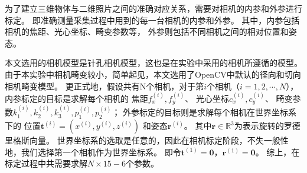 \documentclass{ctexart}
\begin{document}
为了建立三维物体与二维照片之间的准确对应关系，需要对相机的内参和外参进行标定。
即准确测量采集过程中用到的每一台相机的内参和外参。
其中，内参包括相机的焦距、光心坐标、畸变参数等，
外参则包括不同相机之间的相对位置和姿态。

本文选用的相机模型是针孔相机模型，这也是在实验中采用的相机所遵循的模型。
由于本实验中相机畸变较小，简单起见，本文选用了OpenCV中默认的径向和切向相机畸变模型\cite{?}。
更正式地，假设共有N个相机，对于第$i$个相机（$i=1,2,\cdots,N$），
内参标定的目标是求解每个相机的
焦距$f_x^{(i)},f_y^{(i)}$、
光心坐标$c_x^{(i)},c_y^{(i)}$、
畸变参数$k_1^{(i)},k_2^{(i)},k_3^{(i)},p_1^{(i)},p_2^{(i)}$；
外参标定的目标则是求解每个相机在世界坐标系下的
位置$\mathbf{t}^{(i)}=\left(x^{(i)},y^{(i)},z^{(i)}\right)$
和姿态$\mathbf{r}^{(i)}$。
其中$\mathbf{r}\in \mathbb{R}^3$为表示旋转的罗德里格斯向量\cite{?}。
世界坐标系的选取是任意的，因此在相机标定阶段，不失一般性地，我们选择第一个相机作为世界坐标系。
即令$\mathbf{t}^{(1)}=\mathbf{0}$，$\mathbf{r}^{(1)}=\mathbf{0}$。
综上，在标定过程中共需要求解$N\times 15 - 6$个参数。
\end{document}
